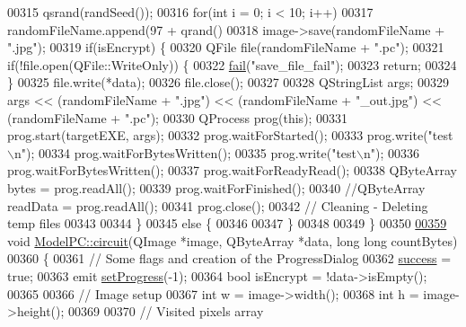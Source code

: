 \begin{DoxyCode}
00315     qsrand(randSeed());
00316     \textcolor{keywordflow}{for}(\textcolor{keywordtype}{int} i = 0; i < 10; i++)
00317         randomFileName.append(97 + qrand() %
00318     image->save(randomFileName + \textcolor{stringliteral}{".jpg"});
00319     \textcolor{keywordflow}{if}(isEncrypt) \{
00320         QFile file(randomFileName + \textcolor{stringliteral}{".pc"});
00321         \textcolor{keywordflow}{if}(!file.open(QFile::WriteOnly)) \{
00322             \hyperlink{class_model_p_c_a47464b59b7e37fcee25e55475708aabd}{fail}(\textcolor{stringliteral}{"save\_file\_fail"});
00323             \textcolor{keywordflow}{return};
00324         \}
00325         file.write(*data);
00326         file.close();
00327 
00328         QStringList args;
00329         args << (randomFileName + \textcolor{stringliteral}{".jpg"}) << (randomFileName + \textcolor{stringliteral}{"\_out.jpg"}) << (randomFileName + \textcolor{stringliteral}{".pc"});
00330         QProcess prog(\textcolor{keyword}{this});
00331         prog.start(targetEXE, args);
00332         prog.waitForStarted();
00333         prog.write(\textcolor{stringliteral}{"test\(\backslash\)n"});
00334         prog.waitForBytesWritten();
00335         prog.write(\textcolor{stringliteral}{"test\(\backslash\)n"});
00336         prog.waitForBytesWritten();
00337         prog.waitForReadyRead();
00338         QByteArray bytes = prog.readAll();
00339         prog.waitForFinished();
00340         \textcolor{comment}{//QByteArray readData = prog.readAll();}
00341         prog.close();
00342         \textcolor{comment}{// Cleaning - Deleting temp files}
00343 
00344     \}
00345     \textcolor{keywordflow}{else} \{
00346 
00347     \}
00348 
00349 \}
00350 
\hypertarget{modelpc_8cpp_source.tex_l00359}{}\hyperlink{class_model_p_c_a1d0091062a0c836b283ec2f67411623b}{00359} \textcolor{keywordtype}{void} \hyperlink{class_model_p_c_a1d0091062a0c836b283ec2f67411623b}{ModelPC::circuit}(QImage *image, QByteArray *data, \textcolor{keywordtype}{long} \textcolor{keywordtype}{long} countBytes)
00360 \{
00361     \textcolor{comment}{// Some flags and creation of the ProgressDialog}
00362     \hyperlink{class_model_p_c_a945ffbbc44a832b953c191debd448f4c}{success} = \textcolor{keyword}{true};
00363     emit \hyperlink{class_model_p_c_afdcd80f0ed5062e145a71f09b0897547}{setProgress}(-1);
00364     \textcolor{keywordtype}{bool} isEncrypt = !data->isEmpty();
00365 
00366     \textcolor{comment}{// Image setup}
00367     \textcolor{keywordtype}{int} w = image->width();
00368     \textcolor{keywordtype}{int} h = image->height();
00369 
00370     \textcolor{comment}{// Visited pixels array}

\end{DoxyCode}
